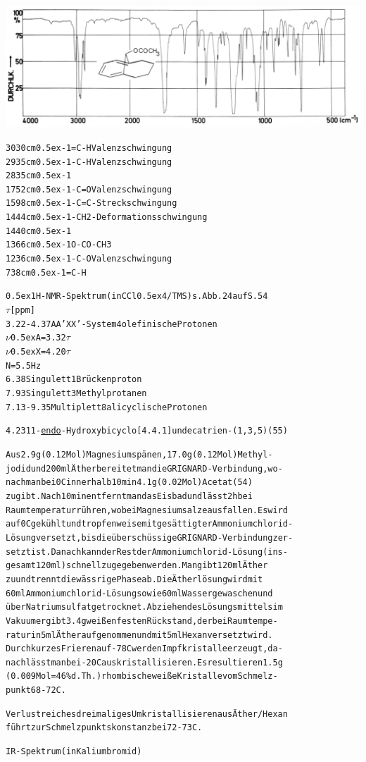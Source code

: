 \documentclass[a4paper,11pt]{article}
\begin{document}
\hspace*{-0.5cm}\includegraphics[width=15.04cm]{IR_052}
\begin{alltt}

3030 cm\raise0.5ex\hbox{-1} =C-H     Valenzschwingung
2935 cm\raise0.5ex\hbox{-1} -C-H     Valenzschwingung
2835 cm\raise0.5ex\hbox{-1}
1752 cm\raise0.5ex\hbox{-1} -C=O     Valenzschwingung
1598 cm\raise0.5ex\hbox{-1} -C=C-    Streckschwingung
1444 cm\raise0.5ex\hbox{-1} -CH2-    Deformationsschwingung
1440 cm\raise0.5ex\hbox{-1}
1366 cm\raise0.5ex\hbox{-1} O-CO-CH3
1236 cm\raise0.5ex\hbox{-1} -C-O     Valenzschwingung
 738 cm\raise0.5ex\hbox{-1} =C-H

\leavevmode\raise0.5ex\hbox{1}H-NMR-Spektrum (in CCl\lower0.5ex\hbox{4}/TMS) s. Abb. 24 auf S. 54
  \(\tau\) [ppm]
3.22 - 4.37  AA'XX'-System           4 olefinische Protonen
             \(\nu\)\lower0.5ex\hbox{A} = 3.32\(\tau\)
             \(\nu\)\lower0.5ex\hbox{X} = 4.20\(\tau\)
             N = 5.5 Hz
6.38         Singulett               1 Brückenproton
7.93         Singulett               3 Methylprotanen
7.13 - 9.35  Multiplett              8 alicyclische Protonen

\newpage
{}


4.23 11-\underline{endo}-Hydroxybicyclo[4.4.1]undecatrien-(1‚3,5) (55)

Aus 2.9 g (0.12 Mol) Magnesiumspänen, 17.0 g (0.12 Mol) Methyl-
jodid und 200 ml Äther bereitet man die GRIGNARD-Verbindung, wo-
nach man bei 0\degree{}C innerhalb 10 min 4.1 g (0.02 Mol) Acetat (54)
zugibt. Nach 10 min entfernt man das Eisbad und lässt 2 h bei
Raumtemperatur rühren, wobei Magnesiumsalze ausfallen. Es wird
auf 0\degree{}C gekühlt und tropfenweise mit gesättigter Ammoniumchlorid-
Lösung versetzt, bis die überschüssige GRIGNARD-Verbindung zer-
setzt ist. Danach kann der Rest der Ammoniumchlorid-Lösung (ins-
gesamt 120 ml) schnell zugegeben werden. Man gibt 120 ml Äther
zu und trennt die wässrige Phase ab. Die Ätherlösung wird mit
60 ml Ammoniumchlorid-Lösung sowie 60 ml Wasser gewaschen und
über Natriumsulfat getrocknet. Abziehen des Lösungsmittels im
Vakuum ergibt 3.4 g weißen festen Rückstand, der bei Raumtempe-
ratur in 5 ml Äther aufgenommen und mit 5 ml Hexan versetzt wird.
Durch kurzes Frieren auf - 78\degree{}C werden Impfkristalle erzeugt, da-
nach lässt man bei -20\degree{}C auskristallisieren. Es resultieren 1.5 g
(0.009 Mol = 46 \% d.Th.) rhombische weiße Kristalle vom Schmelz-
punkt 68 - 72\degree{}C.

Verlustreiches dreimaliges Umkristallisieren aus Äther/Hexan
führt zur Schmelzpunktskonstanz bei 72 - 73\degree{}C.

IR-Spektrum (in Kaliumbromid)
\end{alltt}
\end{document}
